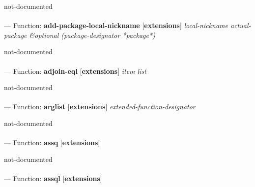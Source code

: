\begin{adjustwidth}{5em}{5em}
not-documented
\end{adjustwidth}

\paragraph{}
\label{EXTENSIONS:ADD-PACKAGE-LOCAL-NICKNAME}
--- Function: \textbf{add-package-local-nickname} [\textbf{extensions}] \textit{local-nickname actual-package \&optional (package-designator *package*)}

\begin{adjustwidth}{5em}{5em}
not-documented
\end{adjustwidth}

\paragraph{}
\label{EXTENSIONS:ADJOIN-EQL}
--- Function: \textbf{adjoin-eql} [\textbf{extensions}] \textit{item list}

\begin{adjustwidth}{5em}{5em}
not-documented
\end{adjustwidth}

\paragraph{}
\label{EXTENSIONS:ARGLIST}
--- Function: \textbf{arglist} [\textbf{extensions}] \textit{extended-function-designator}

\begin{adjustwidth}{5em}{5em}
not-documented
\end{adjustwidth}

\paragraph{}
\label{EXTENSIONS:ASSQ}
--- Function: \textbf{assq} [\textbf{extensions}] \textit{}

\begin{adjustwidth}{5em}{5em}
not-documented
\end{adjustwidth}

\paragraph{}
\label{EXTENSIONS:ASSQL}
--- Function: \textbf{assql} [\textbf{extensions}] \textit{}

